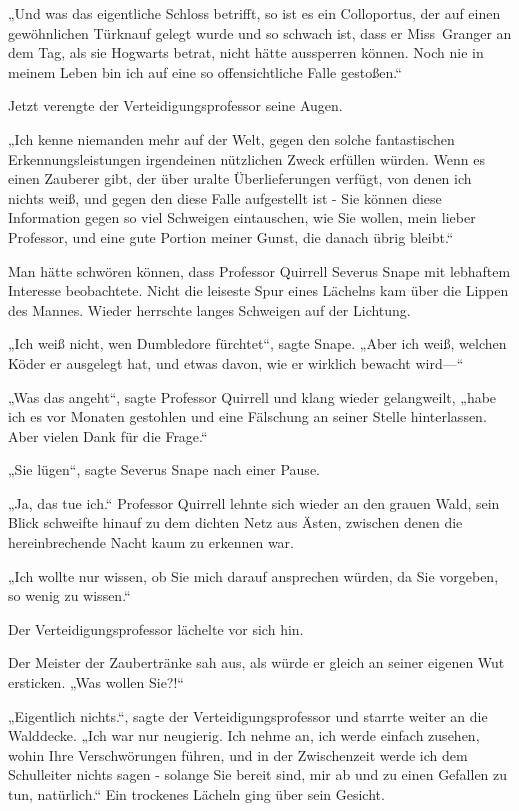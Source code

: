 {„Und was das eigentliche Schloss betrifft, so ist es ein Colloportus, der auf einen gewöhnlichen Türknauf gelegt wurde und so schwach ist, dass er Miss~Granger an dem Tag, als sie Hogwarts betrat, nicht hätte aussperren können. Noch nie in meinem Leben bin ich auf eine so offensichtliche Falle gestoßen.“

Jetzt verengte der Verteidigungsprofessor seine Augen.

„Ich kenne niemanden mehr auf der Welt, gegen den solche fantastischen Erkennungsleistungen irgendeinen nützlichen Zweck erfüllen würden. Wenn es einen Zauberer gibt, der über uralte Überlieferungen verfügt, von denen ich nichts weiß, und gegen den diese Falle aufgestellt ist - Sie können diese Information gegen so viel Schweigen eintauschen, wie Sie wollen, mein lieber Professor, und eine gute Portion meiner Gunst, die danach übrig bleibt.“

Man hätte schwören können, dass Professor Quirrell Severus Snape mit lebhaftem Interesse beobachtete. Nicht die leiseste Spur eines Lächelns kam über die Lippen des Mannes. Wieder herrschte langes Schweigen auf der Lichtung.

„Ich weiß nicht, wen Dumbledore fürchtet“, sagte Snape. „Aber ich weiß, welchen Köder er ausgelegt hat, und etwas davon, wie er wirklich bewacht wird—“

„Was das angeht“, sagte Professor Quirrell und klang wieder gelangweilt, „habe ich es vor Monaten gestohlen und eine Fälschung an seiner Stelle hinterlassen. Aber vielen Dank für die Frage.“

„Sie lügen“, sagte Severus Snape nach einer Pause.

„Ja, das tue ich.“ Professor Quirrell lehnte sich wieder an den grauen Wald, sein Blick schweifte hinauf zu dem dichten Netz aus Ästen, zwischen denen die hereinbrechende Nacht kaum zu erkennen war.

„Ich wollte nur wissen, ob Sie mich darauf ansprechen würden, da Sie vorgeben, so wenig zu wissen.“

Der Verteidigungsprofessor lächelte vor sich hin.

Der Meister der Zaubertränke sah aus, als würde er gleich an seiner eigenen Wut ersticken. „Was wollen Sie?!“

„Eigentlich nichts.“, sagte der Verteidigungsprofessor und starrte weiter an die Walddecke. „Ich war nur neugierig. Ich nehme an, ich werde einfach zusehen, wohin Ihre Verschwörungen führen, und in der Zwischenzeit werde ich dem Schulleiter nichts sagen - solange Sie bereit sind, mir ab und zu einen Gefallen zu tun, natürlich.“ Ein trockenes Lächeln ging über sein Gesicht.

}
